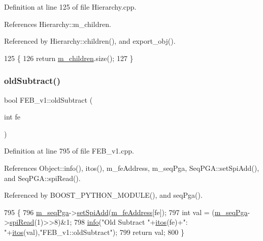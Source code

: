 Definition at line 125 of file Hierarchy.\+cpp.



References Hierarchy\+::m\+\_\+children.



Referenced by Hierarchy\+::children(), and export\+\_\+obj().


\begin{DoxyCode}
125                                            \{
126   \textcolor{keywordflow}{return} \hyperlink{classHierarchy_a038816763941fd4a930504917f60483b}{m\_children}.size();
127 \}
\end{DoxyCode}
\mbox{\label{classFEB__v1_a5b277ace76b9e511c055ad94d241dd61}} 
\subsubsection{\texorpdfstring{old\+Subtract()}{oldSubtract()}}
{\footnotesize\ttfamily bool F\+E\+B\+\_\+v1\+::old\+Subtract (\begin{DoxyParamCaption}\item[{int}]{fe }\end{DoxyParamCaption})}



Definition at line 795 of file F\+E\+B\+\_\+v1.\+cpp.



References Object\+::info(), itos(), m\+\_\+fe\+Address, m\+\_\+seq\+Pga, Seq\+P\+G\+A\+::set\+Spi\+Add(), and Seq\+P\+G\+A\+::spi\+Read().



Referenced by B\+O\+O\+S\+T\+\_\+\+P\+Y\+T\+H\+O\+N\+\_\+\+M\+O\+D\+U\+L\+E(), and seq\+Pga().


\begin{DoxyCode}
795                                 \{
796   \hyperlink{classFEB__v1_a6c7804ac86796f233a8393043adf2e77}{m\_seqPga}->\hyperlink{classSeqPGA_ac998ce3a6d9b5f2e88cc8393f8c1df53}{setSpiAdd}(\hyperlink{classFEB__v1_a4e1945c2d5b434125f375e9d0fc6d99f}{m\_feAddress}[fe]);
797   \textcolor{keywordtype}{int} val = (\hyperlink{classFEB__v1_a6c7804ac86796f233a8393043adf2e77}{m\_seqPga}->\hyperlink{classSeqPGA_ab3d0e5e5d4014bc7a92588a76b8713d4}{spiRead}(1)>>8)&1;
798   \hyperlink{classObject_a644fd329ea4cb85f54fa6846484b84a8}{info}(\textcolor{stringliteral}{"Old Subtract "}+\hyperlink{Tools_8h_af330027dbdafb9a30768b3613c553e60}{itos}(fe)+\textcolor{stringliteral}{": "}+\hyperlink{Tools_8h_af330027dbdafb9a30768b3613c553e60}{itos}(val),\textcolor{stringliteral}{"FEB\_v1::oldSubtract"});
799   \textcolor{keywordflow}{return} val;
800 \}
\end{DoxyCode}
\mbox{\label{classHierarchy_aee461dc930ce3871636ff87f075b1b83}} 
